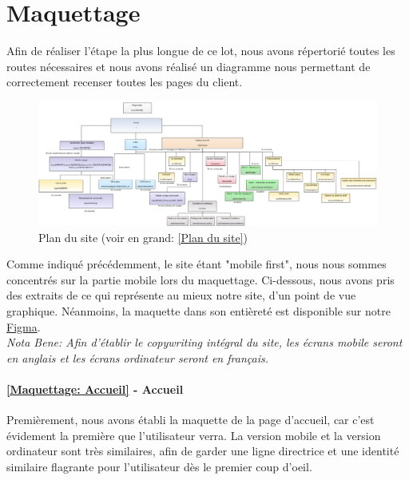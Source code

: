\section{Maquettage}

Afin de réaliser l'étape la plus longue de ce lot, nous avons répertorié toutes les routes nécessaires et nous avons réalisé un diagramme nous permettant de correctement recenser toutes les pages du client.

\begin{figure}[th]
\centering
\includegraphics[width=\linewidth]{medias/sitemap.png}
\decoRule
\caption{Plan du site (voir en grand: \ref{Plan du site})}
\end{figure}

Comme indiqué précédemment, le site étant "mobile first", nous nous sommes concentrés sur la partie mobile lors du maquettage. Ci-dessous, nous avons pris des extraits de ce qui représente au mieux notre site, d'un point de vue graphique. Néanmoins, la maquette dans son entièreté est disponible sur notre \href{https://www.figma.com/file/LGITOTXFWN2n8fHyYUB8B2/Untitled?node-id=221\%3A766}{Figma}.\\

\textit{Nota Bene: Afin d'établir le copywriting intégral du site, les écrans mobile seront en anglais et les écrans ordinateur seront en français.}

\paragraph{\ref{Maquettage: Accueil} -  Accueil}
Premièrement, nous avons établi la maquette de la page d'accueil, car c'est évidement la première que l'utilisateur verra. La version mobile et la version ordinateur sont très similaires, afin de garder une ligne directrice et une identité similaire flagrante pour l'utilisateur dès le premier coup d'oeil. 

